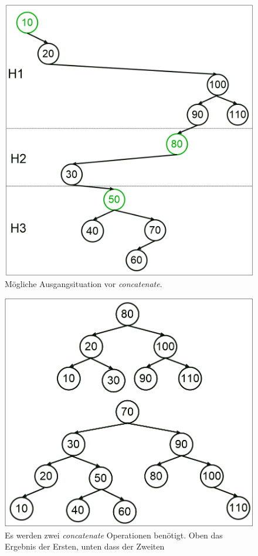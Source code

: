 \documentclass[a4paper,12pt]{article}
\begin{document}
\begin{figure}[h]
	\centering
	\includegraphics[height= 0.5\textwidth]{"Medien/Zipper/hybrid/concatPfad"}
	\caption{Mögliche Ausgangsituation vor \textit{concatenate}.}
	\label{fig:concatPfad}
\end{figure} 
\begin{figure}[h]
	\centering
	\includegraphics[height= 0.5\textwidth]{"Medien/Zipper/hybrid/concatHybrid"}
	\caption{Es werden zwei  \textit{concatenate} Operationen benötigt. Oben das Ergebnis der Ersten, unten dass der Zweiten }
	\label{fig:concatHybrid}
\end{figure} 
\end{document}
